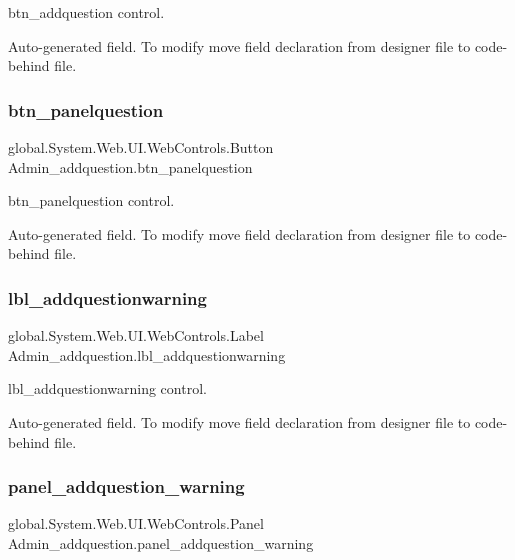 btn\+\_\+addquestion control. 

Auto-\/generated field. To modify move field declaration from designer file to code-\/behind file. \mbox{\label{class_admin__addquestion_ab92c21d32da5d15deddf96f5be608ad7}} 
\subsubsection{\texorpdfstring{btn\_panelquestion}{btn\_panelquestion}}
{\footnotesize\ttfamily global.\+System.\+Web.\+U\+I.\+Web\+Controls.\+Button Admin\+\_\+addquestion.\+btn\+\_\+panelquestion\hspace{0.3cm}{\ttfamily [protected]}}



btn\+\_\+panelquestion control. 

Auto-\/generated field. To modify move field declaration from designer file to code-\/behind file. \mbox{\label{class_admin__addquestion_aef99774530024c9b88b1dd2f71b4269a}} 
\subsubsection{\texorpdfstring{lbl\_addquestionwarning}{lbl\_addquestionwarning}}
{\footnotesize\ttfamily global.\+System.\+Web.\+U\+I.\+Web\+Controls.\+Label Admin\+\_\+addquestion.\+lbl\+\_\+addquestionwarning\hspace{0.3cm}{\ttfamily [protected]}}



lbl\+\_\+addquestionwarning control. 

Auto-\/generated field. To modify move field declaration from designer file to code-\/behind file. \mbox{\label{class_admin__addquestion_a22416d110dda5270298d890ee3d076b9}} 
\subsubsection{\texorpdfstring{panel\_addquestion\_warning}{panel\_addquestion\_warning}}
{\footnotesize\ttfamily global.\+System.\+Web.\+U\+I.\+Web\+Controls.\+Panel Admin\+\_\+addquestion.\+panel\+\_\+addquestion\+\_\+warning\hspace{0.3cm}{\ttfamily [protected]}}



